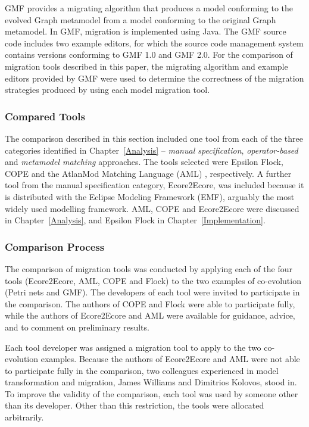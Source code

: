 GMF provides a migrating algorithm that produces a model conforming to the evolved Graph metamodel from a model conforming to the original Graph metamodel. In GMF, migration is implemented using Java. The GMF source code includes two example editors, for which the source code management system contains versions conforming to GMF 1.0 and GMF 2.0. For the comparison of migration tools described in this paper, the migrating algorithm and example editors provided by GMF were used to determine the correctness of the migration strategies produced by using each model migration tool.

\subsubsection{Compared Tools}
\label{subsec:method_tools}
The comparison described in this section included one tool from each of the three categories identified in Chapter~\ref{Analysis} -- \emph{manual specification}, \emph{operator-based} and \emph{metamodel matching} approaches. The tools selected were Epsilon Flock, COPE \cite{herrmannsdoerfer09cope} and the AtlanMod Matching Language (AML) \cite{garces09managing}, respectively. A further tool from the manual specification category, Ecore2Ecore, was included because it is distributed with the Eclipse Modeling Framework (EMF), arguably the most widely used modelling framework. AML, COPE and Ecore2Ecore were discussed in Chapter~\ref{Analysis}, and Epsilon Flock in Chapter~\ref{Implementation}.


\subsubsection{Comparison Process}
\label{subsec:method_process}
The comparison of migration tools was conducted by applying each of the four tools (Ecore2Ecore, AML, COPE and Flock) to the two examples of co-evolution (Petri nets and GMF). The developers of each tool were invited to participate in the comparison. The authors of COPE and Flock were able to participate fully, while the authors of Ecore2Ecore and AML were available for guidance, advice, and to comment on preliminary results.

Each tool developer was assigned a migration tool to apply to the two co-evolution examples. Because the authors of Ecore2Ecore and AML were not able to participate fully in the comparison, two colleagues experienced in model transformation and migration, James Williams and Dimitrios Kolovos, stood in. To improve the validity of the comparison, each tool was used by someone other than its developer. Other than this restriction, the tools were allocated arbitrarily.

